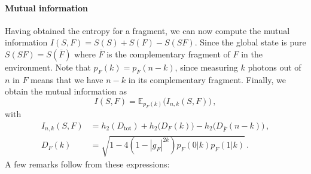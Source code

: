 \paragraph*{Mutual information}
Having obtained the entropy for a fragment, we can now
compute the mutual information $I(S,F) = S(S) + S(F) - S(SF)$. Since
the global state is pure $S(SF) = S(\overline{F})$ where $\overline{F}$ is the
complementary fragment of $F$ in the environment.
Note that
$p_F(k) = p_{\overline{F}}(n-k)$, since measuring
$k$ photons out of $n$ in $F$ means that we have $n-k$ in its complementary 
fragment. Finally, we obtain the mutual information as
%
\begin{equation}
I(S,F) = \mathbb{E}_{p_F(k)}\big( I_{n,k}(S,F) \big)\, ,
\end{equation}
with
%
\begin{subequations}
\begin{align}
I_{n,k}(S,F) &=  
	h_2(D_{\text{tot}})
	+ h_2\big( D_{F}(k)\big) 
	- h_2\big(D_{\overline{F}}(n-k)\big)\, ,
\label{eq/Ink-definition}
\\
D_{F}(k)
	&= \sqrt{1-4(1-|g_F|^{2k})p_F(0|k)p_F(1|k)}
\,.
\label{eq/Fock-deco-coeff}
\end{align}
\end{subequations}
A few remarks follow from these expressions:
%

